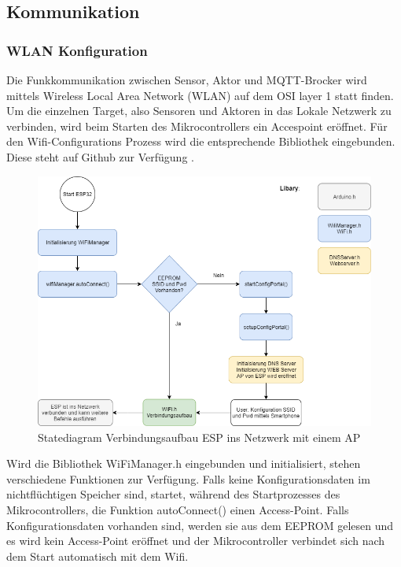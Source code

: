 \newpage
\subsection{Kommunikation}\label{subsec: Kommunikation} 
\subsubsection{WLAN Konfiguration}\label{subsub: Wlan Konfiguration}
Die Funkkommunikation zwischen Sensor, Aktor und MQTT-Brocker wird mittels Wireless Local Area Network (WLAN) auf dem OSI layer 1 statt finden. Um die einzelnen Target, also Sensoren und Aktoren in das Lokale Netzwerk zu verbinden, wird beim Starten des Mikrocontrollers ein Accespoint eröffnet. Für den Wifi-Configurations Prozess wird die entsprechende Bibliothek eingebunden. Diese steht auf Github zur Verfügung \cite{zhouhan0126_zhouhan0126/wifimanager-esp32_2019}. 

\begin{figure}[H]
	\centering
	\includegraphics[width=\textwidth]{graphics/statediagramWiFi.png}
	\caption{Statediagram Verbindungsaufbau ESP ins Netzwerk mit einem AP}
	\label{pic: statediagramWiFi}
\end{figure}   

Wird die Bibliothek WiFiManager.h eingebunden und initialisiert, stehen verschiedene Funktionen zur Verfügung. Falls keine Konfigurationsdaten im nichtflüchtigen Speicher sind, startet, während des Startprozesses des Mikrocontrollers, die Funktion autoConnect() einen Access-Point. Falls Konfigurationsdaten vorhanden sind, werden sie aus dem EEPROM gelesen und es wird kein Access-Point eröffnet und der Mikrocontroller verbindet sich nach dem Start automatisch mit dem Wifi.


